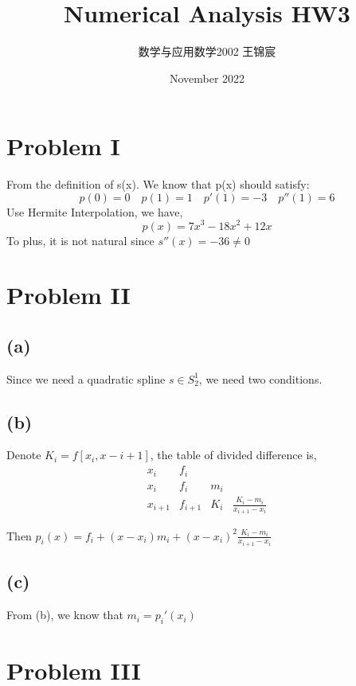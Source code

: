 \documentclass[UTF8]{ctexart}
\title{Numerical Analysis HW3}
\author{数学与应用数学2002 王锦宸 }
\date{November 2022}
\begin{document}
\maketitle

\section*{Problem I}
\noindent From the definition of s(x). We know that p(x) should satisfy:
$$p(0) = 0\quad p(1) = 1\quad p'(1) = -3\quad p''(1) = 6$$
Use Hermite Interpolation, we have,
$$p(x) = 7x^3 - 18x^2 + 12x$$
To plus, it is not natural since $s''(x) = -36 \neq 0$

\section*{Problem II}
\subsection*{(a)}
Since we need a quadratic spline $s \in S_{2}^1$, we need two conditions.

\subsection*{(b)}
\noindent Denote $K_i = f[x_i,x-{i+1}]$, the table of divided difference is,
\begin{equation}
    \begin{array}{c|ccc}
        x_{i} & f_{i} & & \\
        x_{i} & f_{i} & m_{i} & \\
        x_{i+1} & f_{i+1} & K_{i} & \frac{K_{i}-m_{i}}{x_{i+1}-x_{i}}
    \nonumber
    \end{array}
\end{equation}

\noindent Then $p_i(x) = f_i + (x-x_i)m_i+(x-x_i)^2\frac{K_i-m_i}{x_{i+1}-x_i}$

\subsection*{(c)}
\noindent From (b), we know that $m_i = p_i'(x_i)$

\section*{Problem III}
\end{document}
